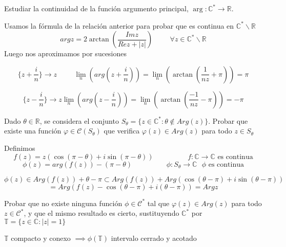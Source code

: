 \begin{ejer}
	Estudiar la continuidad de la función argumento principal, $\arg : \mathbb{C}^{\ast} \rightarrow \mathbb{R}$.
\end{ejer}

\begin{sol}


Usamos la fórmula de la relación anterior para probar que es continua en $\mathbb{C}^{\ast} \backslash \mathbb{R}$
$$  
arg z = 2\arctan (\frac{Imz}{Rez + |z|}) \hspace{1cm} \forall z\in\mathbb{C}^{\ast}\backslash\mathbb{R}
$$
Luego nos aproximamos por sucesiones

$$  
\{ z+\frac{i}{n} \} \rightarrow z \hspace{1cm}
\lim_n(arg(z+\frac{i}{n})) = \lim_n( \arctan(\frac{1}{nz}+\pi) ) = \pi
$$

$$
\{ z-\frac{i}{n} \} \rightarrow z
\lim_n(arg(z-\frac{i}{n})) = \lim_n( \arctan(\frac{-1}{nz}-\pi) ) = -\pi
$$
\end{sol}

\begin{ejer}
	Dado $\theta\in\mathbb{R}$, se considera el conjunto $S_{\theta} = \{ z\in\mathbb{C}^{\ast} : \theta\not\in Arg(z) \}$. 
	Probar que existe una función $\varphi\in\mathcal{C}(S_{\theta})$ que verifica $\varphi(z)\in Arg(z)$ para todo $z\in S_{\theta}$
\end{ejer}

\begin{sol}
Definimos
$$
f(z) = z( \cos(\pi-\theta) + i\sin(\pi-\theta) ) \hspace{2cm} f:\mathbb{C}\rightarrow \mathbb{C} \text{ es continua}
$$
$$
\phi(z) = arg(f(z)) - (\pi-\theta) \hspace{2cm} \phi: S_{\theta} \rightarrow \mathbb{C} \text{ $\phi$ es continua}
$$

$$ 
\phi(z) \in Arg (f(z)) + \theta-\pi \subset Arg (f(z)) + Arg( \cos(\theta-\pi)+i\sin(\theta-\pi) ) 
$$
$$= Arg ( f(z)-\cos(\theta-\pi)+i(\theta-\pi) ) = Argz
$$
\end{sol}

\begin{ejer}
	Probar que no existe ninguna función $\phi\in\mathcal{C}^{\ast}$ tal que $\varphi(z)\in Arg(z)$ para todo $z\in\mathcal{C}^{\ast}$, y que el mismo resultado es cierto, sustituyendo $\mathbb{C}^{\ast}$ por $\mathbb{T}=\{ z\in\mathbb{C} : |z|=1 \}$
\end{ejer}

$\mathbb{T}$ compacto y conexo $\implies \phi(\mathbb{T})$ intervalo cerrado y acotado

